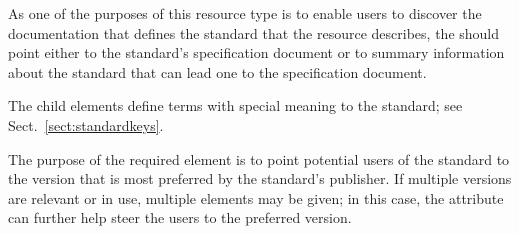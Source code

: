 \documentclass[11pt,a4paper]{ivoa}
\begin{document}

As one of the purposes of this resource type is to enable users to
discover the documentation that defines the standard that the resource 
describes, the  should point either
to the standard's specification document or to summary information about
the standard that can lead one to the specification document.  


The child  elements define terms with special
meaning to the standard; see Sect.~\ref{sect:standardkeys}.

The purpose of the required 
element is to point potential users of the standard to the version
that is most preferred by the standard's publisher.  If multiple
versions are relevant or in use, multiple elements may be given; in
this case, the  attribute can further help steer the
users to the preferred version.
\end{document}
